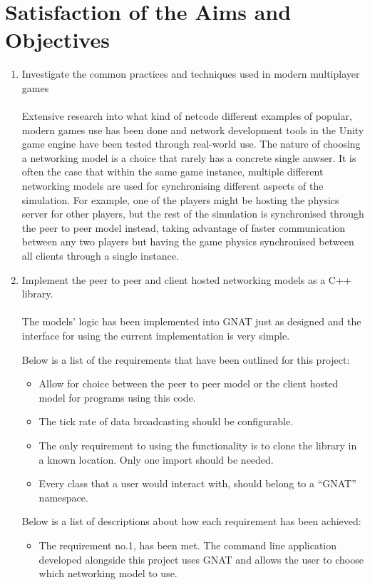 \section{Satisfaction of the Aims and Objectives}
\begin{enumerate}
\item Investigate the common practices and techniques used in modern multiplayer games
  \\\\
  Extensive research into what kind of netcode different examples of popular, modern games use has been done and network development tools in the Unity game engine have been tested through real-world use. The nature of choosing a networking model is a choice that rarely has a concrete single anwser. It is often the case that within the same game instance, multiple different networking models are used for synchronising different aspects of the simulation. For example, one of the players might be hosting the physics server for other players, but the rest of the simulation is synchronised through the peer to peer model instead, taking advantage of faster communication between any two players but having the game physics synchronised between all clients through a single instance.


\item Implement the peer to peer and client hosted networking models as a C++ library.
  \\\\
  The models' logic has been implemented into GNAT just as designed and the interface for using the current implementation is very simple.

  Below is a list of the requirements that have been outlined for this project:

  \begin{itemize}
    \item Allow for choice between the peer to peer model or the client hosted model for programs using this code.
\item The tick rate of data broadcasting should be configurable.
\item The only requirement to using the functionality is to clone the library in a known location. Only one import should be needed.
\item Every class that a user would interact with, should belong to a ``GNAT'' namespace.
\end{itemize}

Below is a list of descriptions about how each requirement has been achieved:
\begin{itemize}
\item The requirement no.1, has been met. The command line application developed alongside this project uses GNAT and allows the user to choose which networking model to use.


\end{itemize}
\end{enumerate}
